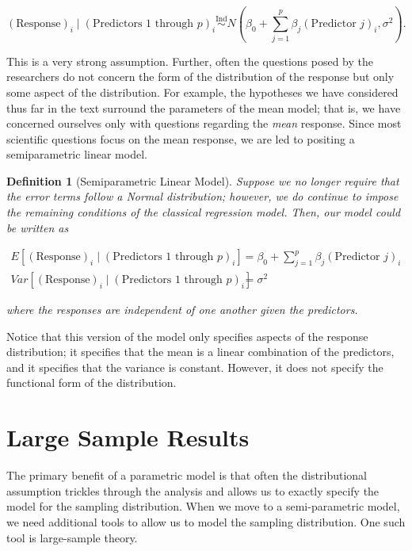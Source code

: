 \documentclass[
]{book}
\theoremstyle{plain}
\theoremstyle{mydefn}
\newtheorem{definition}{Definition}[chapter]
\theoremstyle{myexmpl}
\theoremstyle{remark}
\begin{document}
\[(\text{Response})_i \mid (\text{Predictors 1 through } p)_i \stackrel{\text{Ind}}{\sim}N\left(\beta_0 + \sum\limits_{j=1}^{p} \beta_j (\text{Predictor } j)_i, \sigma^2\right).\]

This is a very strong assumption. Further, often the questions posed by the researchers do not concern the form of the distribution of the response but only some aspect of the distribution. For example, the hypotheses we have considered thus far in the text surround the parameters of the mean model; that is, we have concerned ourselves only with questions regarding the \emph{mean} response. Since most scientific questions focus on the mean response, we are led to positing a semiparametric linear model.

\begin{definition}[Semiparametric Linear Model]
Suppose we no longer require that the error terms follow a Normal distribution; however, we do continue to impose the remaining conditions of the classical regression model. Then, our model could be written as

\[
\begin{aligned}
  E\left[(\text{Response})_i \mid (\text{Predictors 1 through } p)_i\right]
    &= \beta_0 + \sum\limits_{j=1}^{p} \beta_j (\text{Predictor } j)_i \\
  Var\left[(\text{Response})_i \mid (\text{Predictors 1 through } p)_i\right]
    &= \sigma^2
\end{aligned}
\]

where the responses are independent of one another given the predictors.
\end{definition}

Notice that this version of the model only specifies aspects of the response distribution; it specifies that the mean is a linear combination of the predictors, and it specifies that the variance is constant. However, it does not specify the functional form of the distribution.

\hypertarget{large-sample-results}{%
\section{Large Sample Results}\label{large-sample-results}}

The primary benefit of a parametric model is that often the distributional assumption trickles through the analysis and allows us to exactly specify the model for the sampling distribution. When we move to a semi-parametric model, we need additional tools to allow us to model the sampling distribution. One such tool is large-sample theory.
\end{document}
